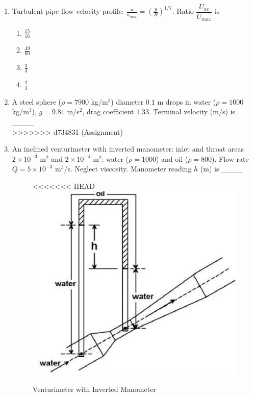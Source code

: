 \documentclass[journal,12pt,onecolumn]{IEEEtran}
\begin{document}
\begin{enumerate}
\begin{enumerate}
\begin{enumerate}[label=\arabic*)]
\vspace{0.5cm}

\item Turbulent pipe flow velocity profile: $\displaystyle \frac{u}{u_{max}} = \left(\frac{y}{R}\right)^{1/7}$. Ratio $\dfrac{U_{av}}{U_{max}}$ is  
\hfill{} \\

\vspace{0.2cm}
\begin{enumerate}[label=\alph*)]
\item $\frac{15}{16}$
\vspace{0.1cm}
\item $\frac{49}{60}$
\vspace{0.1cm}
\item $\frac{3}{4}$
\vspace{0.1cm}
\item $\frac{2}{3}$
\end{enumerate}
\vspace{0.5cm}

\item A steel sphere ($\rho=7900$ kg/m$^3$) diameter $0.1$ m drops in water ($\rho=1000$ kg/m$^3$), $g=9.81$ m/s$^2$, drag coefficient $1.33$. Terminal velocity (m/s) is \_\_\_\_
\hfill{} \\

\vspace{0.5cm}
>>>>>>> d734831 (Assignment)

\item An inclined venturimeter with inverted manometer: inlet and throat areas $2\times 10^{-3}$ m$^2$ and $2\times 10^{-4}$ m$^2$; water ($\rho=1000$) and oil ($\rho=800$). Flow rate $Q=5\times 10^{-3}$ m$^3$/s. Neglect viscosity. Manometer reading $h$ (m) is \_\_\_\_

\begin{figure}[htbp]
  \centering
<<<<<<< HEAD
  \includegraphics[width=.5\columnwidth]{figs/B/fig7.png} 
  \caption{Venturimeter with Inverted Manometer}
  \label{fig:figs/B/fig7.png}
\end{figure}


\end{enumerate}
\end{enumerate}
\end{enumerate}
\end{document}
